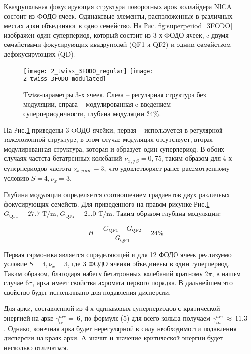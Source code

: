 \par Квадрупольная фокусирующая структура поворотных арок коллайдера NICA состоит из ФОДО ячеек. Одинаковые элементы, расположенные в различных местах арки объединяют в одно семейство. На Рис.\ref{fig:superperiod_3FODO} изображен один суперпериод, который состоит из 3-х ФОДО ячеек, c двумя семействами фокусирующих квадруполей (QF1 и QF2) и одним семейством дефокусирующих (QD).

\begin{figure}
   \texttt{[image: 2\_twiss\_3FODO\_regular]}
   \texttt{[image: 2\_twiss\_3FODO\_modulated]}
   \caption{Twiss-параметры 3-х ячеек. Слева – регулярная структура без модуляции, справа – модулированная c введением суперпериодичности, глубина модуляции 24\%.}
   \label{fig:twiss_3FODO}
\end{figure}

На Рис.\ref{fig:twiss_3FODO} приведены 3 ФОДО ячейки, первая – используется в регулярной тяжелоионной структуре, в этом случае модуляция отсутствует, вторая – модулированная структура,  которая и образует один суперпериод. В обоих случаях частота бетатронных колебаний $\nu_{x,y\ S}=0,75$, таким образом для 4-х суперпериодов частота $\nu_{x,y\ arc}=3$, что удовлетворяет ранее рассмотренному условию $S=4, \nu_x=3$.

Глубина модуляции определяется соотношением градиентов двух различных фокусирующих семейств. Для приведенного на правом рисунке Рис.\ref{fig:twiss_3FODO} $G_{\textrm{QF1}}=27.7$ T/m, $G_{\textrm{QF2}}=21.0$ T/m. Таким образом глубина модуляции:

\begin{equation}
H=\frac{G_{\textrm{QF1}}-G_{\textrm{QF2}}}{G_{\textrm{QF1}}}=24\%
\label {eq:gamma_tr_modulated}
\end{equation}

\par Первая гармоника является определяющей и для 12 ФОДО ячеек реализуемо условие $S=4, \nu_x=3$, где 3 ФОДО ячейки объединены в один суперпериод. Таким образом, благодаря набегу бетатронных колебаний кратному $2\pi$, в нашем случае $6\pi$, арка имеет свойства ахромата первого порядка. В дальнейшем это свойство будет использовано для подавления дисперсии.

\par Для арки, составленной из 4-х одинаковых суперпериодов с критической энергией  на арке $\gamma_{tr}^{arc}=\ 6$, по формуле (5) для всего кольца получаем $\gamma_{tot}^{arc}\ \approx\ 11.3$. Однако, конечная арка будет нерегулярной в силу необходимости подавления дисперсии на краях арки. А значит и значение критической энергии будет несколько отличаться.

